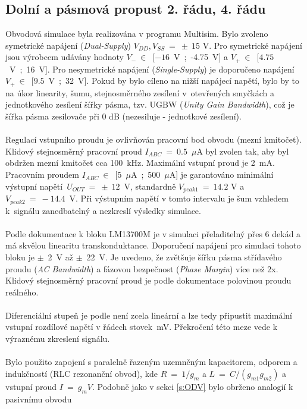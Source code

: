 \subsection{Dolní a pásmová propust 2. řádu, 4. řádu}\label{s:DP2}
\noindent Obvodová simulace byla realizována v programu Multisim. Bylo zvoleno symetrické napájení (\textit{Dual-Supply}) $V_{DD},V_{SS}~=~\pm~15$ V. Pro symetrické napájení jsou výrobcem udávány hodnoty $V_{-}~\in$~$[-16$~V~;~-4.75~V] a $V_{+}~\in$~$[4.75$~V~;~16~V]. Pro nesymetrické napájení (\textit{Single-Supply}) je doporučeno napájení $V_{+}~\in$~$[9.5$~V~;~32~V]. Pokud by bylo cíleno na nižší napájecí napětí, bylo by to na úkor linearity, šumu, stejnosměrného zesílení v~otevřených smyčkách a jednotkového zesílení šířky pásma, tzv. UGBW (\textit{Unity Gain Bandwidth}), což je šířka pásma zesilovače při 0 dB (nezesiluje - jednotkové zesílení).\\
\\
Regulací vstupního proudu je ovlivňován pracovní bod obvodu (mezní kmitočet). Klidový stejnosměrný pracovní proud $I_{ABC}~=~0.5$~$\mu$A byl zvolen tak, aby byl obdržen mezní kmitočet cca 100~kHz. Maximální vstupní proud je 2~mA. Pracovním proudem $I_{ABC}~\in$~$[5$~$\mu$A~;~500~$\mu$A] je garantováno minimální výstupní napětí~$U_{OUT}~=~\pm~12$~V, standardně $V_{peak 1}~=~14.2$ V a $V_{peak 2}~=~-14.4$~V. Při výstupním napětí v tomto intervalu je šum vzhledem k~signálu zanedbatelný a nezkreslí výsledky simulace.\\
\\
\noindent Podle dokumentace k bloku LM13700M je v simulaci přeladitelný přes 6 dekád a má skvělou linearitu transkonduktance. Doporučení napájení pro simulaci tohoto bloku je $\pm$~2~V až $\pm$~22~V. Je uvedeno, že zvětšuje šířku pásma střídavého proudu (\textit{AC Bandwidth}) a fázovou bezpečnost (\textit{Phase Margin}) více než 2x. Klidový stejnosměrný pracovní proud je podle dokumentace polovinou proudu reálného.\\
\\
\noindent Diferenciální stupeň je podle není zcela lineární a lze tedy připustit maximální vstupní rozdílové napětí v řádech stovek~mV. Překročení této meze vede k výraznému zkreslení signálu.\\
\\
\noindent Bylo použito zapojení s paralelně řazeným uzemněným kapacitorem, odporem a indukčností (RLC rezonanční obvod), kde $R~=~1/g_m$ a $L~=~C/(g_{m1}g_{m2})$ a vstupní proud $I~=~g_mV$. Podobně jako v sekci \ref{s:ODV} bylo obrženo analogií k pasivnímu obvodu
